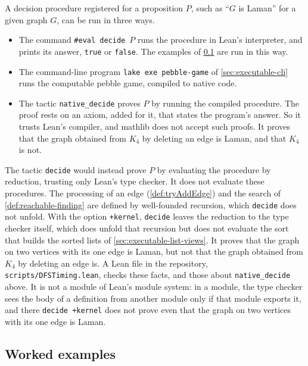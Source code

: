 A decision procedure registered for a proposition $P$, such as
``$G$ is Laman'' for a given graph $G$, can be run in three ways.
\begin{itemize}
  \item The command \texttt{\#eval decide}~$P$ runs the procedure in
    Lean's interpreter, and prints its answer, \texttt{true} or
    \texttt{false}. The examples of \cref{sec:executable-examples} are
    run in this way.
  \item The command-line program \texttt{lake exe pebble-game} of
    \cref{sec:executable-cli} runs the computable pebble game, compiled
    to native code.
  \item The tactic \texttt{native\_decide} proves $P$ by running the
    compiled procedure. The proof rests on an axiom, added for it, that
    states the program's answer. So it trusts Lean's compiler, and
    mathlib does not accept such proofs. It proves that the graph
    obtained from $K_4$ by deleting an edge is Laman, and that $K_4$ is
    not.
\end{itemize}
The tactic \texttt{decide} would instead prove $P$ by evaluating the
procedure by reduction, trusting only Lean's type checker. It does not
evaluate these procedures. The processing of an edge
(\cref{def:tryAddEdge}) and the search of \cref{def:reachable-finding}
are defined by well-founded recursion, which \texttt{decide} does not
unfold. With the option \texttt{+kernel}, \texttt{decide} leaves the
reduction to the type checker itself, which does unfold that recursion
but does not evaluate the sort that builds the sorted lists of
\cref{sec:executable-list-views}. It proves that the graph on two
vertices with its one edge is Laman, but not that the graph obtained
from $K_4$ by deleting an edge is. A Lean file in the repository,
\texttt{scripts/DFSTiming.lean}, checks these facts, and those about
\texttt{native\_decide} above. It is not a module of Lean's module
system: in a module, the type checker sees the body of a definition
from another module only if that module exports it, and there
\texttt{decide +kernel} does not prove even that the graph on two
vertices with its one edge is Laman.

\subsection{Worked examples}
\label{sec:executable-examples}


